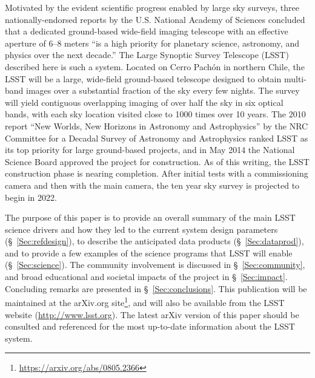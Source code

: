 Motivated by the evident scientific progress enabled by large sky surveys,
three nationally-endorsed reports by the U.S. National Academy of Sciences
\citep{NAP9839,NAP10079,NAP10432}
concluded that a dedicated ground-based wide-field imaging telescope with an effective aperture
of 6--8 meters ``is a high priority for planetary science, astronomy, and physics
over the next decade.'' The Large Synoptic Survey Telescope (LSST) described here is
such a system. Located on Cerro Pach\'on in northern Chile,
the LSST will be a large, wide-field ground-based telescope
designed to obtain multi-band images over a substantial fraction of the sky
every few nights. The survey will yield contiguous overlapping imaging of over
half the sky in six optical bands, with each sky location visited close to 1000 times over
10 years. The 2010 report ``New Worlds, New Horizons in Astronomy and Astrophysics''
by the NRC Committee for a Decadal Survey of Astronomy and
Astrophysics \citep{NAP12951}
ranked LSST as its top priority for large ground-based projects, and in May 2014 the National
Science Board approved the project for construction.
As of this writing, the LSST construction phase is nearing completion.
After initial tests with a commissioning camera and then with the main camera, the
ten year sky survey is projected to begin in 2022.

The purpose of this paper is to provide an overall summary of the main LSST
science drivers and how they led to the current system design parameters
(\S~\ref{Sec:refdesign}), to describe the anticipated data products (\S~\ref{Sec:dataprod}),
and to provide a few examples of the science programs that LSST will enable
(\S~\ref{Sec:science}). The community involvement is discussed in \S~\ref{Sec:community},
and broad educational and societal impacts of the project in \S~\ref{Sec:impact}. Concluding
remarks are presented in \S~\ref{Sec:conclusions}. This publication will be maintained
at the arXiv.org site\footnote{\url{https://arxiv.org/abs/0805.2366}}, and will also
be available from the LSST website (\url{http://www.lsst.org}). The latest arXiv version of this paper
should be consulted and referenced for the most up-to-date information about the
LSST system.
